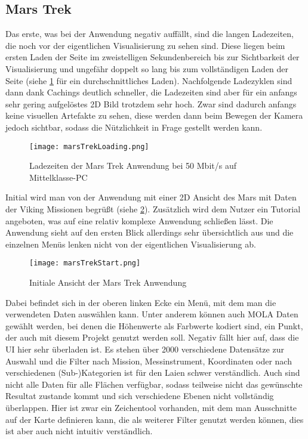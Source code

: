 \subsection{Mars Trek}\label{marsTrek}
Das erste, was bei der Anwendung negativ auffällt, sind die langen Ladezeiten, die noch vor der eigentlichen Visualisierung zu sehen sind. Diese liegen beim ersten Laden der Seite im zweistelligen Sekundenbereich bis zur Sichtbarkeit der Visualisierung und ungefähr doppelt so lang bis zum vollständigen Laden der Seite (siehe \ref{marsTrekLoading} für ein durchschnittliches Laden). Nachfolgende Ladezyklen sind dann dank Cachings deutlich schneller, die Ladezeiten sind aber für ein anfangs sehr gering aufgelöstes 2D Bild trotzdem sehr hoch. Zwar sind dadurch anfangs keine visuellen Artefakte zu sehen, diese werden dann beim Bewegen der Kamera jedoch sichtbar, sodass die Nützlichkeit in Frage gestellt werden kann.

\begin{figure}[H]
  \texttt{[image: marsTrekLoading.png]}
  \caption{Ladezeiten der Mars Trek Anwendung bei 50 Mbit/s auf Mittelklasse-PC}
  \label{marsTrekLoading}
\end{figure}


Initial wird man von der Anwendung mit einer 2D Ansicht des Mars mit Daten der Viking Missionen begrüßt (siehe \ref{marsTrekStart}). Zusätzlich wird dem Nutzer ein Tutorial angeboten, was auf eine relativ komplexe Anwendung schließen lässt. Die Anwendung sieht auf den ersten Blick allerdings sehr übersichtlich aus und die einzelnen Menüs lenken nicht von der eigentlichen Visualisierung ab.

\begin{figure}[H]
  \texttt{[image: marsTrekStart.png]}
  \caption{Initiale Ansicht der Mars Trek Anwendung}
  \label{marsTrekStart}
\end{figure}

Dabei befindet sich in der oberen linken Ecke ein Menü, mit dem man die verwendeten Daten auswählen kann. Unter anderem können auch MOLA Daten gewählt werden, bei denen die Höhenwerte als Farbwerte kodiert sind, ein Punkt, der auch mit diesem Projekt genutzt werden soll. Negativ fällt hier auf, dass die UI hier sehr überladen ist. Es stehen über 2000 verschiedene Datensätze zur Auswahl und die Filter nach Mission, Messinstrument, Koordinaten oder nach verschiedenen (Sub-)Kategorien ist für den Laien schwer verständlich. Auch sind nicht alle Daten für alle Flächen verfügbar, sodass teilweise nicht das gewünschte Resultat zustande kommt und sich verschiedene Ebenen nicht vollständig überlappen. Hier ist zwar ein Zeichentool vorhanden, mit dem man Ausschnitte auf der Karte definieren kann, die als weiterer Filter genutzt werden können, dies ist aber auch nicht intuitiv verständlich. 

